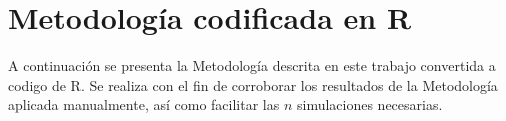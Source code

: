 \documentclass[11pt,twoside,openright,spanish]{report}
\numberwithin{equation}{chapter}
\numberwithin{figure}{chapter}
\numberwithin{table}{chapter}
\begin{document}
\fancyhead[LO]{}
\fancyhead[RE]{}
\pagestyle{fancy}

\chapter{Metodología codificada en R }\label{desarrolloconstadm}

A continuación se presenta la Metodología descrita en este trabajo convertida a codigo de R. Se realiza con el fin de corroborar los resultados de la Metodología aplicada manualmente, así como facilitar las $n$ simulaciones necesarias.
\end{document}
